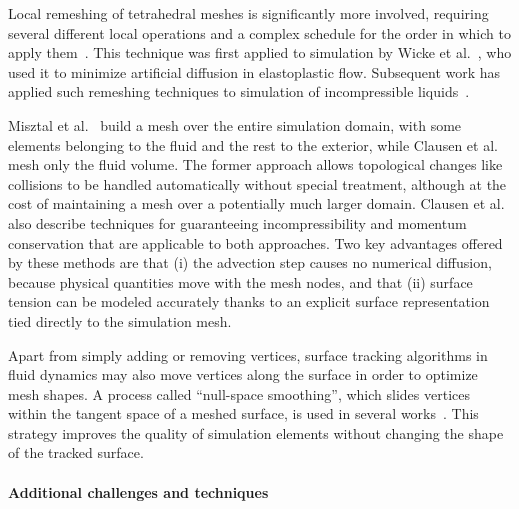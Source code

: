 Local remeshing of tetrahedral meshes is significantly more involved, requiring several different local operations and a complex schedule for the order in which to apply them~\cite{Klingner2007}.
This technique was first applied to simulation by Wicke et al.~\cite{Wicke2010}, who used it to minimize artificial diffusion in elastoplastic flow.
Subsequent work has applied such remeshing techniques to simulation of incompressible liquids~\cite{Misztal2012a,Misztal2012b,Clausen2013}.

Misztal et al.~\cite{Misztal2012a,Misztal2012b} build a mesh over the entire simulation domain, with some elements belonging to the fluid and the rest to the exterior, while Clausen et al.~\cite{Clausen2013} mesh only the fluid volume.
The former approach allows topological changes like collisions to be handled automatically without special treatment, although at the cost of maintaining a mesh over a potentially much larger domain.
Clausen et al. also describe techniques for guaranteeing incompressibility and momentum conservation that are applicable to both approaches. 
Two key advantages offered by these methods are that (i) the advection step causes no numerical diffusion, because physical quantities move with the mesh nodes, and that (ii) surface tension can be modeled accurately thanks to an explicit surface representation tied directly to the simulation mesh.

Apart from simply adding or removing vertices, surface tracking algorithms in fluid dynamics may also move vertices along the surface in order to optimize mesh shapes.
A process called ``null-space smoothing'', which slides vertices within the tangent space of a meshed surface, is used in several works~\cite{Jiao2007,Brochu2009,Brochu2010,Wicke2010,Clausen2013}.
This strategy improves the quality of simulation elements without changing the shape of the tracked surface.

\paragraph*{Additional challenges and techniques}

